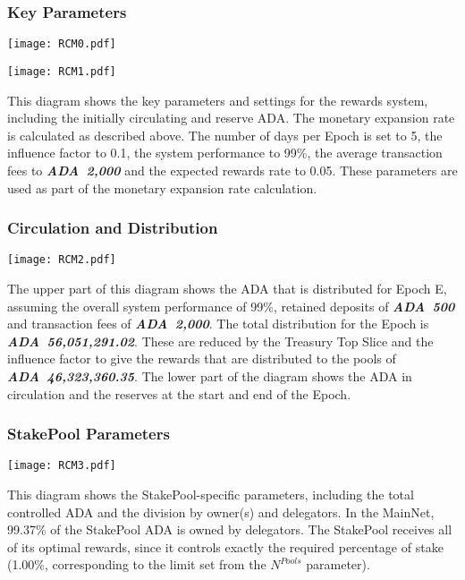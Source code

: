 \documentclass[11pt,a4paper,dvipsnames,twosided,final]{article}
\newcommand{\ada}{ADA{}}
\newcommand{\ADA}[1]{\textbf{\emph{\ada~{#1}}}}
\begin{document}
\subsubsection*{Key Parameters}

\hspace{-0.65in}\begin{minipage}{\textwidth}
\noindent\texttt{[image: RCM0.pdf]}
\vspace{-7in}

\noindent\texttt{[image: RCM1.pdf]}
\vspace{-3in}
\end{minipage}

\noindent
This diagram shows the key parameters and settings for the rewards system, including the initially
circulating and reserve \ada{}.  The monetary expansion rate is calculated as described above.
The number of days per Epoch is set to 5, the influence factor to 0.1, the system performance
to 99\%, the average transaction fees to \ADA{2,000} and the expected rewards rate to 0.05.
These parameters are used as part of the monetary expansion rate calculation.


\subsubsection*{Circulation and Distribution}

\hspace{-0.65in}
\texttt{[image: RCM2.pdf]}

\noindent
The upper part of this diagram shows the \ada{} that is distributed for Epoch E, assuming the overall system performance of 99\%,
retained deposits of \ADA{500} and transaction fees of \ADA{2,000}.  The total distribution for the
Epoch is \ADA{56,051,291.02}.  These are reduced by the Treasury Top Slice and the influence factor
to give the rewards that are distributed to the pools of \ADA{46,323,360.35}.
%
The lower part of the diagram shows the \ada{} in circulation and the reserves at the start and end of the Epoch.

\subsubsection*{StakePool Parameters}

\hspace{-0.65in}
\texttt{[image: RCM3.pdf]}

\noindent
This diagram shows the StakePool-specific parameters, including the total controlled \ada{} and the
division by owner(s) and delegators.  In the MainNet, 99.37\% of the StakePool \ada{} is owned
by delegators.  The StakePool receives all of its optimal rewards, since it controls
exactly the required percentage of stake (1.00\%, corresponding to the limit set from
the $N^{\textit{Pools}}$ parameter).
\end{document}
